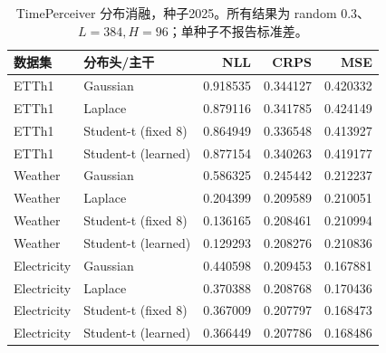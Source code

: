 \begin{table}[t]
\centering\small
\caption{TimePerceiver 分布消融，种子2025。所有结果为 random 0.3、$L=384,H=96$；单种子不报告标准差。}\label{tab:distribution}
\begin{tabular}{llrrr}
\toprule
数据集 & 分布头/主干 & NLL & CRPS & MSE \\
\midrule
ETTh1 & Gaussian & 0.918535 & 0.344127 & 0.420332 \\
ETTh1 & Laplace & 0.879116 & 0.341785 & 0.424149 \\
ETTh1 & Student-t (fixed 8) & 0.864949 & 0.336548 & 0.413927 \\
ETTh1 & Student-t (learned) & 0.877154 & 0.340263 & 0.419177 \\
Weather & Gaussian & 0.586325 & 0.245442 & 0.212237 \\
Weather & Laplace & 0.204399 & 0.209589 & 0.210051 \\
Weather & Student-t (fixed 8) & 0.136165 & 0.208461 & 0.210994 \\
Weather & Student-t (learned) & 0.129293 & 0.208276 & 0.210836 \\
Electricity & Gaussian & 0.440598 & 0.209453 & 0.167881 \\
Electricity & Laplace & 0.370388 & 0.208768 & 0.170436 \\
Electricity & Student-t (fixed 8) & 0.367009 & 0.207797 & 0.168473 \\
Electricity & Student-t (learned) & 0.366449 & 0.207786 & 0.168486 \\
\bottomrule
\end{tabular}
\end{table}
